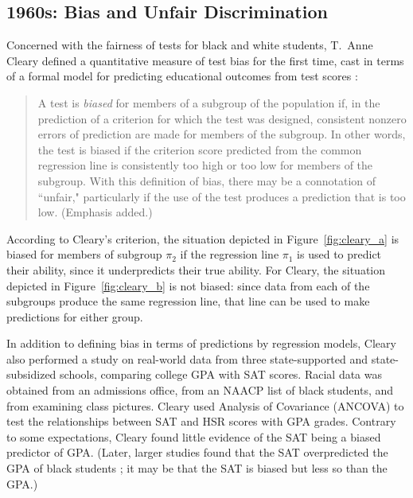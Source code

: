 \documentclass[sigconf,letterpaper,9pt]{acmart}
\begin{document}
\subsection{1960s: Bias and Unfair Discrimination}\label{sec:60s}

Concerned with the fairness of tests for black and white students,
T.\ Anne Cleary defined a quantitative measure of test bias for the first time, cast in terms of a formal model for predicting educational
outcomes from test scores \cite{cleary1966test, cleary1968test}:\vspace{-.15em}
%
\begin{quote}
\fontsize{8.5}{10}\selectfont
A test is {\em biased} for members of a subgroup of the population if, in the prediction of a criterion
for which the test was designed, consistent nonzero errors of prediction are made for members of the subgroup. In other words, the test is biased if the criterion score predicted from
the common regression line is consistently too high or too low for members of the subgroup.
With this definition of bias, there may be a connotation of ``unfair," particularly if the use of
the test produces a prediction that is too low. (Emphasis added.)
\end{quote} 

According to Cleary's criterion, the situation depicted in Figure~\ref{fig:cleary_a} is biased for members of subgroup $\pi_2$ if the regression line $\pi_1$
is used to predict their ability, since it underpredicts
their true ability. For Cleary, the situation depicted in Figure~\ref{fig:cleary_b} is not biased: since data from each of the subgroups produce the same regression line,
that line can be used to make predictions for either group.

In addition to defining bias in terms of predictions
by regression models, Cleary also performed a study on real-world data from three state-supported and state-subsidized schools, comparing college GPA with SAT
scores.
Racial data was obtained from an admissions office, from an NAACP list of black students, and from examining class pictures.
Cleary used Analysis of Covariance ({\sc ANCOVA}) to test the relationships between
SAT and HSR scores with GPA grades.
Contrary to some expectations, Cleary found little evidence of the SAT being
a biased predictor of GPA. (Later, larger studies found that the SAT
overpredicted the GPA of black students \cite{vars1998scholastic}; 
it may be that the SAT is biased but less so than the GPA.)
\end{document}
